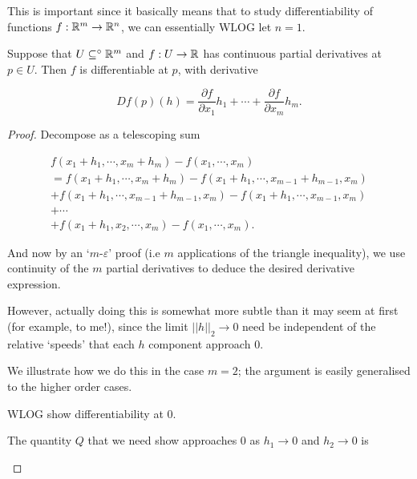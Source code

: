 \documentclass[11pt]{scrartcl}
\begin{document}
This is important since it basically means that to study differentiability of functions $f : \mathbb R^m \rightarrow \mathbb R^n$, we can essentially WLOG let $n=1$.

\begin{theorem}
        Suppose that $U \subseteq^\circ \mathbb R^m$ and $f : U \rightarrow \mathbb R$ has continuous partial derivatives at $p \in U$. Then $f$ is differentiable at $p$, with derivative
        
        \begin{equation}
            Df(p)(h) = \frac{\partial f}{\partial x_1}h_1 + \cdots + \frac{\partial f}{\partial x_m}h_m.
            \label{Deriv1}
        \end{equation}
    
        \begin{proof}
            Decompose as a telescoping sum
    
            \begin{align}
            f(x_1 + h_1, \cdots , x_m + h_m) - f(x_1, \cdots , x_m) \\ 
            = f(x_1 + h_1, \cdots , x_m + h_m) - f(x_1 + h_1, \cdots , x_{m-1} + h_{m-1} , x_m) \\
            + f(x_1 + h_1, \cdots , x_{m-1} + h_{m-1}, x_m) - f(x_1 + h_1, \cdots , x_{m-1}, x_m) \\
            + \cdots \\
            + f(x_1 + h_1, x_2, \cdots , x_m) - f(x_1, \cdots , x_m).
            \end{align}
    
            And now by an `$m$-$\varepsilon$' proof (i.e $m$ applications of the triangle inequality), we use continuity of the $m$ partial derivatives to deduce the desired derivative expression.

            However, actually doing this is somewhat more subtle than it may seem at first (for example, to me!), since the limit $||h||_2 \to 0$ need be independent of the relative `speeds' that each $h$ component approach 0.

            We illustrate how we do this in the case $m=2$; the argument is easily generalised to the higher order cases.

            \begin{example}
                WLOG show differentiability at 0.

                The quantity $Q$ that we need show approaches 0 as $h_1 \to 0$ and $h_2 \to 0$ is


\end{example}
\end{proof}
\end{theorem}
\end{document}
